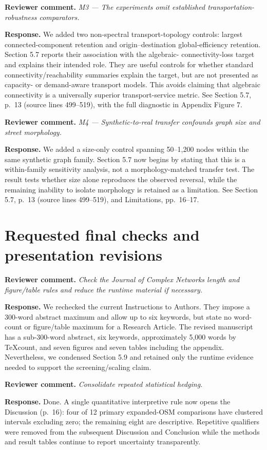 \documentclass[10pt]{article}
\newcommand{\review}[1]{\textbf{Reviewer comment.} \emph{#1}}
\newcommand{\response}{\textbf{Response.} }
\begin{document}
\review{M3 --- The experiments omit established transportation-robustness
comparators.}

\response We added two non-spectral transport-topology controls: largest
connected-component retention and origin--destination global-efficiency
retention. Section 5.7 reports their association with the algebraic-
connectivity-loss target and explains their intended role. They are useful
controls for whether standard connectivity/reachability summaries explain the
target, but are not presented as capacity- or demand-aware transport models.
This avoids claiming that algebraic connectivity is a universally superior
transport-service metric. See Section 5.7, p.~13 (source lines 499--519), with
the full diagnostic in Appendix Figure 7.

\review{M4 --- Synthetic-to-real transfer confounds graph size and street
morphology.}

\response We added a size-only control spanning 50--1,200 nodes within the same
synthetic graph family. Section 5.7 now begins by stating that this is a
within-family sensitivity analysis, not a morphology-matched transfer test.
The result tests whether size alone reproduces the observed reversal, while the
remaining inability to isolate morphology is retained as a limitation. See
Section 5.7, p.~13 (source lines 499--519), and Limitations, pp.~16--17.

\section*{Requested final checks and presentation revisions}

\review{Check the Journal of Complex Networks length and figure/table rules and
reduce the runtime material if necessary.}

\response We rechecked the current Instructions to Authors. They impose a
300-word abstract maximum and allow up to six keywords, but state no word-count
or figure/table maximum for a Research Article. The revised manuscript has a
sub-300-word abstract, six keywords, approximately 5,000 words by TeXcount, and
seven figures and seven tables including the appendix. Nevertheless, we
condensed Section 5.9 and retained only the runtime evidence needed to support
the screening/scaling claim.

\review{Consolidate repeated statistical hedging.}

\response Done. A single quantitative interpretive rule now opens the
Discussion (p.~16): four of 12 primary expanded-OSM comparisons have clustered
intervals excluding zero; the remaining eight are descriptive. Repetitive
qualifiers were removed from the subsequent Discussion and Conclusion while
the methods and result tables continue to report uncertainty transparently.
\end{document}
